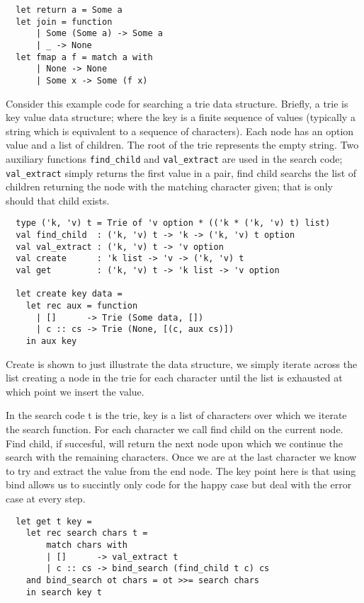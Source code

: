 \begin{verbatim}
  let return a = Some a
  let join = function
      | Some (Some a) -> Some a
      | _ -> None
  let fmap a f = match a with
      | None -> None
      | Some x -> Some (f x)
\end{verbatim}

Consider this example code for searching a trie data structure.
Briefly, a trie is key value data structure;
where the key is a finite sequence of values
(typically a string which is equivalent to a sequence of characters).
Each node has an option value and a list of children.
The root of the trie represents the empty string.
Two auxiliary functions \texttt{find\_child} and \texttt{val\_extract}
are used in the search code; \texttt{val\_extract}
simply returns the first value in a pair,
find child searchs the list of children returning
the node with the matching character given;
that is only should that child exists.

\begin{verbatim}
  type ('k, 'v) t = Trie of 'v option * (('k * ('k, 'v) t) list)
  val find_child  : ('k, 'v) t -> 'k -> ('k, 'v) t option
  val val_extract : ('k, 'v) t -> 'v option
  val create      : 'k list -> 'v -> ('k, 'v) t
  val get         : ('k, 'v) t -> 'k list -> 'v option

  let create key data =
    let rec aux = function
      | []      -> Trie (Some data, [])
      | c :: cs -> Trie (None, [(c, aux cs)])
    in aux key
\end{verbatim}

Create is shown to just illustrate the data structure,
we simply iterate across the list creating a node in the trie for each character
until the list is exhausted at which point we insert the value.


In the search code t is the trie, key is a list of characters over which
we iterate the search function. For each character we call find child on
the current node. Find child, if succesful, will return the next node
upon which we continue the search with the remaining characters. Once we
are at the last character we know to try and extract the value from the end
node. The key point here is that using bind allows us to succintly only code
for the happy case but deal with the error case at every step.

\begin{verbatim}
  let get t key =
    let rec search chars t =
        match chars with
        | []      -> val_extract t
        | c :: cs -> bind_search (find_child t c) cs
    and bind_search ot chars = ot >>= search chars
    in search key t
\end{verbatim}

